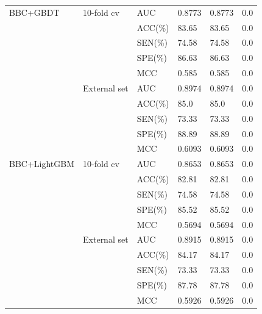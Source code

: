 \begin{tabular}{llllll}
BBC+GBDT & 10-fold cv & AUC & 0.8773 & 0.8773 & 0.0 \\
 &  & ACC(\%) & 83.65 & 83.65 & 0.0 \\
 &  & SEN(\%) & 74.58 & 74.58 & 0.0 \\
 &  & SPE(\%) & 86.63 & 86.63 & 0.0 \\
 &  & MCC & 0.585 & 0.585 & 0.0 \\
 & External set & AUC & 0.8974 & 0.8974 & 0.0 \\
 &  & ACC(\%) & 85.0 & 85.0 & 0.0 \\
 &  & SEN(\%) & 73.33 & 73.33 & 0.0 \\
 &  & SPE(\%) & 88.89 & 88.89 & 0.0 \\
 &  & MCC & 0.6093 & 0.6093 & 0.0 \\
BBC+LightGBM & 10-fold cv & AUC & 0.8653 & 0.8653 & 0.0 \\
 &  & ACC(\%) & 82.81 & 82.81 & 0.0 \\
 &  & SEN(\%) & 74.58 & 74.58 & 0.0 \\
 &  & SPE(\%) & 85.52 & 85.52 & 0.0 \\
 &  & MCC & 0.5694 & 0.5694 & 0.0 \\
 & External set & AUC & 0.8915 & 0.8915 & 0.0 \\
 &  & ACC(\%) & 84.17 & 84.17 & 0.0 \\
 &  & SEN(\%) & 73.33 & 73.33 & 0.0 \\
 &  & SPE(\%) & 87.78 & 87.78 & 0.0 \\
 &  & MCC & 0.5926 & 0.5926 & 0.0 \\
\bottomrule
\end{tabular}

